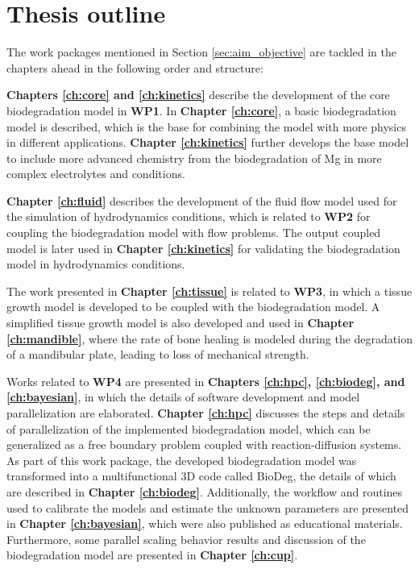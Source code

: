 \section{Thesis outline}

The work packages mentioned in Section \ref{sec:aim_objective} are tackled in the chapters ahead in the following order and structure:

\textbf{Chapters \ref{ch:core} and \ref{ch:kinetics}} describe the development of the core biodegradation model in \textbf{WP1}. In \textbf{Chapter \ref{ch:core}}, a basic biodegradation model is described, which is the base for combining the model with more physics in different applications. \textbf{Chapter \ref{ch:kinetics}} further develops the base model to include more advanced chemistry from the biodegradation of Mg in more complex electrolytes and conditions.

\textbf{Chapter \ref{ch:fluid}} describes the development of the fluid flow model used for the simulation of hydrodynamics conditions, which is related to \textbf{WP2} for coupling the biodegradation model with flow problems. The output coupled model is later used in \textbf{Chapter \ref{ch:kinetics}} for validating the biodegradation model in hydrodynamics conditions.

The work presented in \textbf{Chapter \ref{ch:tissue}} is related to \textbf{WP3}, in which a tissue growth model is developed to be coupled with the biodegradation model. A simplified tissue growth model is also developed and used in \textbf{Chapter \ref{ch:mandible}}, where the rate of bone healing is modeled during the degradation of a mandibular plate, leading to loss of mechanical strength.

Works related to \textbf{WP4} are presented in \textbf{Chapters \ref{ch:hpc}, \ref{ch:biodeg}, and \ref{ch:bayesian}}, in which the details of software development and model parallelization are elaborated. \textbf{Chapter \ref{ch:hpc}} discusses the steps and details of parallelization of the implemented biodegradation model, which can be generalized as a free boundary problem coupled with reaction-diffusion systems. As part of this work package, the developed biodegradation model was transformed into a multifunctional 3D code called BioDeg, the details of which are described in \textbf{Chapter \ref{ch:biodeg}}. Additionally, the workflow and routines used to calibrate the models and estimate the unknown parameters are presented in \textbf{Chapter \ref{ch:bayesian}}, which were also published as educational materials. Furthermore, some parallel scaling behavior results and discussion of the biodegradation model are presented in \textbf{Chapter \ref{ch:cup}}.

